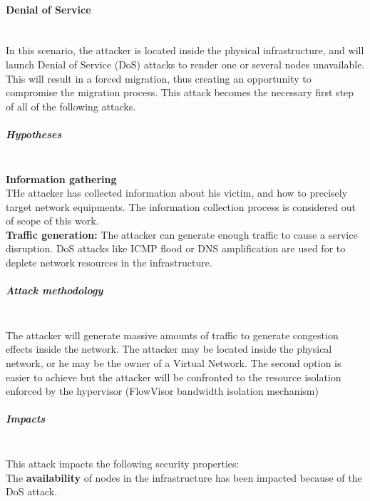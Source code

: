 \paragraph{Denial of Service}\textbf{\\}
In this scenario, the attacker is located inside the physical infrastructure, and will launch Denial of Service (DoS) attacks to render one or several nodes unavailable.
This will result in a forced migration, thus creating an opportunity to compromise the migration process.
This attack becomes the necessary first step of all of the following attacks.

\subparagraph{Hypotheses}\textbf{\\}
\textbf{Information gathering}\textbf{\\}
THe attacker has collected information about his victim, and how to precisely target network equipments.
The information collection process is considered out of scope of this work.\\
\textbf{Traffic generation:} The attacker can generate enough traffic to cause a service disruption.
DoS attacks like ICMP flood or DNS amplification are used for to deplete network resources in the infrastructure.

\subparagraph{Attack methodology}\textbf{\\}
The attacker will generate massive amounts of traffic to generate congestion effects inside the network. The attacker may be located inside the physical network, or he may be the owner of a Virtual Network. The second option is easier to achieve but the attacker will be confronted to the resource isolation enforced by the hypervisor (\ie FlowVisor bandwidth isolation mechanism)


\subparagraph{Impacts}\textbf{\\}
This attack impacts the following security properties:\\
The \textbf{availability} of nodes in the infrastructure has been impacted because of the DoS attack.

